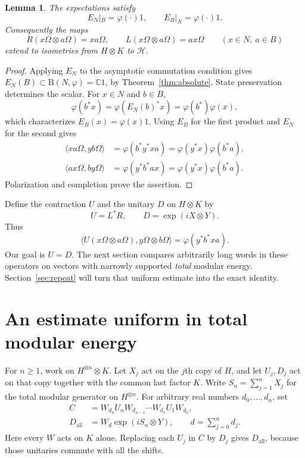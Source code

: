 \documentclass[11pt]{article}
\newtheorem{lemma}[theorem]{Lemma}
\theoremstyle{definition}
\newcommand{\B}{\mathrm B}
\newcommand{\C}{\mathbb C}
\newcommand{\HH}{\mathcal H}
\begin{document}
\begin{lemma}\label{lem:products}
The expectations satisfy
\[
 E_N|_B=\varphi(\cdot)1,\qquad E_B|_N=\varphi(\cdot)1.
\]
Consequently the maps
\[
 R(x\Omega\otimes a\Omega)=xa\Omega,\qquad
 L(x\Omega\otimes a\Omega)=ax\Omega
 \qquad(x\in N,\ a\in B)
\]
extend to isometries from $H\otimes K$ to $\HH$.
\end{lemma}
\begin{proof}
Applying $E_N$ to the asymptotic commutation condition gives
$E_N(B)\subset\B(N,\varphi)=\C1$, by Theorem~\ref{thm:absolute}.
State preservation determines the scalar. For $x\in N$ and $b\in B$,
\[
 \varphi(b^*x)=\varphi(E_N(b)^*x)
 =\varphi(b^*)\varphi(x),
\]
which characterizes $E_B(x)=\varphi(x)1$.
Using $E_B$ for the first product and $E_N$ for the second gives
\begin{align*}
 \langle xa\Omega,yb\Omega\rangle
 &=\varphi(b^*y^*xa)=\varphi(y^*x)\varphi(b^*a),\\
 \langle ax\Omega,by\Omega\rangle
 &=\varphi(y^*b^*ax)=\varphi(y^*x)\varphi(b^*a).
\end{align*}
Polarization and completion prove the assertion.
\end{proof}

Define the contraction $U$ and the unitary $D$ on $H\otimes K$ by
\begin{equation}\label{eq:UD}
 U=L^*R,\qquad D=\exp(iX\otimes Y).
\end{equation}
Thus
\begin{equation}\label{eq:Ucoeff}
 \langle U(x\Omega\otimes a\Omega),y\Omega\otimes b\Omega\rangle
 =\varphi(y^*b^*xa).
\end{equation}
Our goal is $U=D$. The next section compares arbitrarily long words in
these operators on vectors with narrowly supported \emph{total} modular
energy. Section~\ref{sec:repeat} will turn that uniform estimate into the
exact identity.

\section{An estimate uniform in total modular energy}\label{sec:energy}
For $n\ge1$, work on $H^{\otimes n}\otimes K$. Let $X_j$ act on the $j$th
copy of $H$, and let $U_j,D_j$ act on that copy together with the common last
factor $K$. Write $S_n=\sum_{j=1}^nX_j$ for the total modular generator on
$H^{\otimes n}$. For arbitrary real numbers $d_0,\ldots,d_n$, set
\begin{align}
 C&=W_{d_n}U_nW_{d_{n-1}}\cdots W_{d_1}U_1W_{d_0},\label{eq:Cword}\\
 D_{\mathrm{all}}&=W_d\exp(iS_n\otimes Y),\qquad
 d=\sum_{j=0}^n d_j.\label{eq:Dall}
\end{align}
Here every $W$ acts on $K$ alone. Replacing each $U_j$ in $C$ by $D_j$
gives $D_{\mathrm{all}}$, because those unitaries commute with all the shifts.
\end{document}

